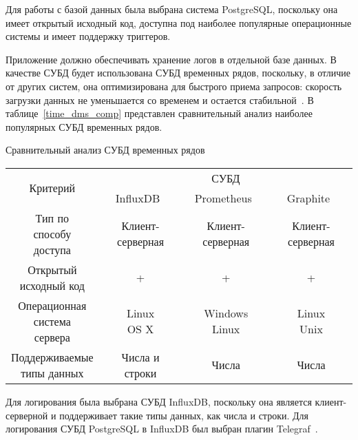 Для работы с базой данных была выбрана система PostgreSQL, поскольку она имеет открытый исходный код, доступна под наиболее популярные операционные системы и имеет поддержку триггеров.

Приложение должно обеспечивать хранение логов в отдельной базе данных. В качестве СУБД будет использована СУБД временных рядов, поскольку, в отличие от других систем, она оптимизирована для быстрого приема запросов: скорость загрузки данных не уменьшается со временем и остается стабильной~\cite{timedb}. В таблице~\ref{time_dms_comp} представлен сравнительный анализ наиболее популярных СУБД временных рядов.

\begin{center}
	\begin{threeparttable}
		\captionsetup{justification=raggedright,singlelinecheck=off}
		\caption{\label{time_dms_comp}Сравнительный анализ СУБД временных рядов}
		\centering
		\begin{tabular}{|c|c|c|c|}
			\hline
			\multirow{2}{*}{Критерий} & \multicolumn{3}{|c|}{СУБД} \\
			\cline{2-4}
			& InfluxDB~\cite{influxdb} & Prometheus~\cite{prometheus} & Graphite~\cite{graphite} \\
			\hline
			\specialcell{Тип по\\способу\\доступа} & Клиент-серверная & Клиент-серверная & Клиент-серверная \\
			\hline
			\specialcell{Открытый\\исходный код} & + & + & + \\
			\hline
			\specialcell{Операционная\\система\\сервера} & \specialcell{Linux\\OS X} & \specialcell{Windows\\Linux} & \specialcell{Linux\\Unix} \\
			\hline
			\specialcell{Поддерживаемые\\типы данных} & Числа и строки & Числа & Числа \\
			\hline
		\end{tabular}
	\end{threeparttable}
\end{center}

Для логирования была выбрана СУБД InfluxDB, поскольку она является клиент-серверной и поддерживает такие типы данных, как числа и строки. Для логирования СУБД PostgreSQL в InfluxDB был выбран плагин Telegraf~\cite{telegraf}.

